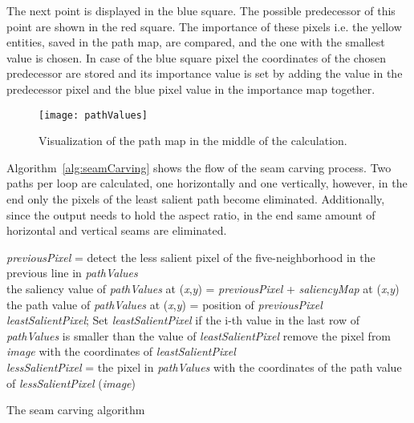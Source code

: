 \documentclass[draft,final]{vutinfth} %
\begin{document}
	The next point is displayed in the blue square.
	The possible predecessor of this point are shown in the red square.
	The importance of these pixels i.e. the yellow entities, saved in the path map, are compared, and the one with the smallest value is chosen.
	In case of the blue square pixel the coordinates of the chosen predecessor are stored and its importance value is set by adding the value in the predecessor pixel and the blue pixel value in the importance map together. 
	\begin{figure}[H]
		\centering		
		\texttt{[image: pathValues]}
		\caption{Visualization of the path map in the middle of the calculation.}
		\label{fig:pathValues}
	\end{figure}
	Algorithm~\ref{alg:seamCarving} shows the flow of the seam carving process.
	Two paths per loop are calculated, one horizontally and one vertically, however, in the end only the pixels of the least salient path become eliminated.
	Additionally, since the output needs to hold the aspect ratio, in the end same amount of horizontal and vertical seams are eliminated. \par 
	\begin{algorithm}
		{
			{
				\textit{previousPixel} = detect the less salient pixel of the five-neighborhood in the previous line in \textit{pathValues} \\
				the saliency value of \textit{pathValues} at (\textit{x},\textit{y}) = \textit{previousPixel} + \textit{saliencyMap} at (\textit{x},\textit{y}) \\
				the path value of \textit{pathValues} at (\textit{x},\textit{y}) = position of  \textit{previousPixel}\\
			}
		}
		\textit{leastSalientPixel};
		{
			Set \textit{leastSalientPixel} if the i-th value in the last row of  \textit{pathValues} is smaller than the value of \textit{leastSalientPixel}
		}
		{
			remove the pixel from \textit{image} with the coordinates of \textit{leastSalientPixel}\\
			\textit{lessSalientPixel} = the pixel in \textit{pathValues} with the coordinates of the path value of \textit{lessSalientPixel}
		}
		\Return(\textit{image})
		\caption{The seam carving algorithm}
		\label{alg:seamCarving}
	\end{algorithm}
	
\end{document}
